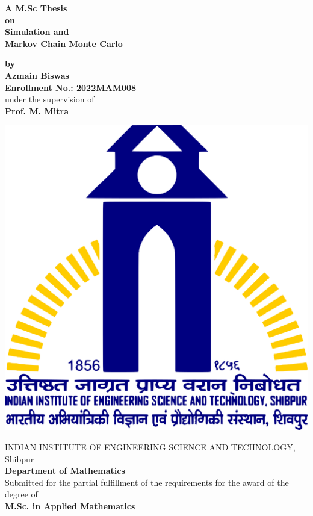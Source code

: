 \begin{titlepage}
    \begin{center}

        \vspace{0.5cm}

        \Large{\textbf{A M.Sc Thesis\\ on}}\\
        \huge{\textbf{Simulation and \\ Markov Chain Monte Carlo}}

        \vspace{0.5cm}
        \large{\textbf{by}}\\ 
        \Large{\textbf{Azmain Biswas}}\\ 
        \Large{\textbf{Enrollment No.: 2022MAM008}}\\ 
        \Large{under the supervision of}\\ 
        \Large{\textbf{Prof. M. Mitra}}

        \vspace{0.5cm}

        \includegraphics[scale = 0.1]{images/IIEST_Shibpur_Logo.svg.png}

        \vspace{0.5cm}

        \Large{{
                INDIAN INSTITUTE OF ENGINEERING SCIENCE AND TECHNOLOGY, Shibpur\\ 
                \textbf{Department of Mathematics}
        }}\\
        \vspace*{0.5cm}
        \large{{Submitted for the partial fulfillment of the requirements for the award of the degree of}}\\
        \Large{\textbf{M.Sc. in Applied Mathematics}}
    \end{center}
\end{titlepage}
